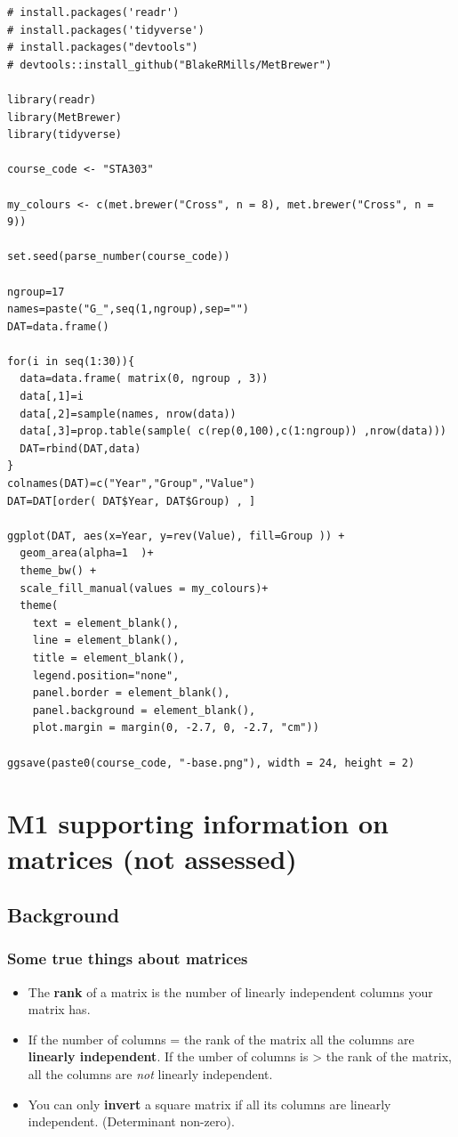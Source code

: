 \documentclass[
  openany]{book}
\providecommand{\tightlist}{%
  \setlength{\itemsep}{0pt}\setlength{\parskip}{0pt}}
\begin{document}
\begin{verbatim}
# install.packages('readr')
# install.packages('tidyverse')
# install.packages("devtools")
# devtools::install_github("BlakeRMills/MetBrewer")

library(readr)
library(MetBrewer)
library(tidyverse)

course_code <- "STA303"

my_colours <- c(met.brewer("Cross", n = 8), met.brewer("Cross", n = 9))

set.seed(parse_number(course_code))

ngroup=17
names=paste("G_",seq(1,ngroup),sep="")
DAT=data.frame()

for(i in seq(1:30)){
  data=data.frame( matrix(0, ngroup , 3))
  data[,1]=i
  data[,2]=sample(names, nrow(data))
  data[,3]=prop.table(sample( c(rep(0,100),c(1:ngroup)) ,nrow(data)))
  DAT=rbind(DAT,data)
}
colnames(DAT)=c("Year","Group","Value")
DAT=DAT[order( DAT$Year, DAT$Group) , ]

ggplot(DAT, aes(x=Year, y=rev(Value), fill=Group )) +
  geom_area(alpha=1  )+
  theme_bw() +
  scale_fill_manual(values = my_colours)+
  theme(
    text = element_blank(),
    line = element_blank(),
    title = element_blank(),
    legend.position="none",
    panel.border = element_blank(),
    panel.background = element_blank(),
    plot.margin = margin(0, -2.7, 0, -2.7, "cm"))

ggsave(paste0(course_code, "-base.png"), width = 24, height = 2)
\end{verbatim}

\hypertarget{matrices}{%
\section{M1 supporting information on matrices (not assessed)}\label{matrices}}

\hypertarget{background}{%
\subsection{Background}\label{background}}

\hypertarget{some-true-things-about-matrices}{%
\subsubsection{Some true things about matrices}\label{some-true-things-about-matrices}}

\begin{itemize}
\tightlist
\item
  The \textbf{rank} of a matrix is the number of linearly independent columns your matrix has.\\
\item
  If the number of columns = the rank of the matrix all the columns are \textbf{linearly independent}. If the umber of columns is \textgreater{} the rank of the matrix, all the columns are \emph{not} linearly independent.\\
\item
  You can only \textbf{invert} a square matrix if all its columns are linearly independent. (Determinant non-zero).
\end{itemize}
\end{document}
